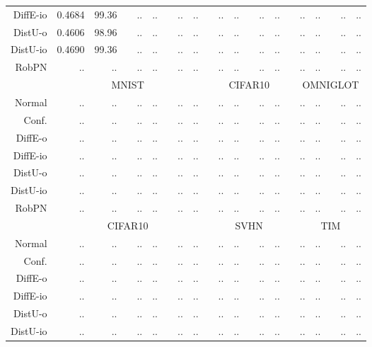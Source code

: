 \begin{table*}
\begin{tiny}
\begin{tabular}{@{}rrrcrrcrrcrrcrrcrrcrr@{}}
			DiffE-io   & 0.4684 & 99.36 & & .. & .. & & .. & .. & & .. & .. & & .. & .. & & .. & .. & & .. & .. \\
			DistU-o    & 0.4606 & 98.96 & & .. & .. & & .. & .. & & .. & .. & & .. & .. & & .. & .. & & .. & .. \\
			DistU-io   & 0.4690 & 99.36 & & .. & .. & & .. & .. & & .. & .. & & .. & .. & & .. & .. & & .. & .. \\
			RobPN      & .. & .. & & .. & .. & & .. & .. & & .. & .. & & .. & .. & & .. & .. & & .. & .. \\
			\midrule
			& \multicolumn{8}{c}{MNIST} & & \multicolumn{5}{c}{CIFAR10} & & \multicolumn{5}{c}{OMNIGLOT} \\
			Normal     & .. & .. & & .. & .. & & .. & .. & & .. & .. & & .. & .. & & .. & .. & & .. & .. \\
			Conf.      & .. & .. & & .. & .. & & .. & .. & & .. & .. & & .. & .. & & .. & .. & & .. & .. \\
			DiffE-o    & .. & .. & & .. & .. & & .. & .. & & .. & .. & & .. & .. & & .. & .. & & .. & .. \\
			DiffE-io   & .. & .. & & .. & .. & & .. & .. & & .. & .. & & .. & .. & & .. & .. & & .. & .. \\
			DistU-o    & .. & .. & & .. & .. & & .. & .. & & .. & .. & & .. & .. & & .. & .. & & .. & .. \\
			DistU-io   & .. & .. & & .. & .. & & .. & .. & & .. & .. & & .. & .. & & .. & .. & & .. & .. \\
			RobPN      & .. & .. & & .. & .. & & .. & .. & & .. & .. & & .. & .. & & .. & .. & & .. & .. \\
			\midrule
			& \multicolumn{8}{c}{CIFAR10} & & \multicolumn{5}{c}{SVHN} & & \multicolumn{5}{c}{TIM} \\
			Normal     & .. & .. & & .. & .. & & .. & .. & & .. & .. & & .. & .. & & .. & .. & & .. & .. \\
			Conf.      & .. & .. & & .. & .. & & .. & .. & & .. & .. & & .. & .. & & .. & .. & & .. & .. \\
			DiffE-o    & .. & .. & & .. & .. & & .. & .. & & .. & .. & & .. & .. & & .. & .. & & .. & .. \\
			DiffE-io   & .. & .. & & .. & .. & & .. & .. & & .. & .. & & .. & .. & & .. & .. & & .. & .. \\
			DistU-o    & .. & .. & & .. & .. & & .. & .. & & .. & .. & & .. & .. & & .. & .. & & .. & .. \\
			DistU-io   & .. & .. & & .. & .. & & .. & .. & & .. & .. & & .. & .. & & .. & .. & & .. & .. \\

\end{tabular}
\end{tiny}
\end{table*}
